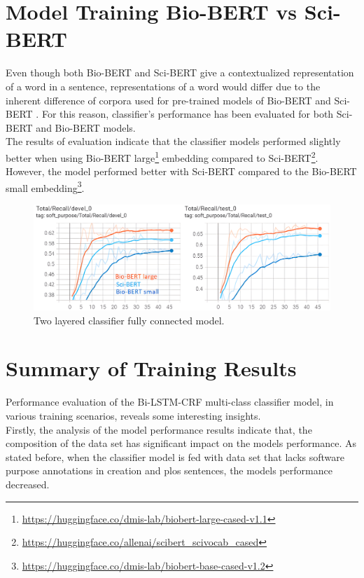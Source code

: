 \section{Model Training Bio-BERT vs Sci-BERT}
\label{sec:chapter06:biosci}

Even though both \ac{Bio-BERT} and \ac{Sci-BERT} give a contextualized representation of a word in a sentence, representations of a word would differ due to the inherent difference of corpora used for pre-trained models of Bio-BERT and Sci-BERT \citep{beltagy2019scibert,li2019fine}. For this reason, classifier’s performance has been evaluated for both Sci-BERT and Bio-BERT models. \\

The results of evaluation indicate that the classifier models performed slightly better when using Bio-BERT large\footnote{\url{https://huggingface.co/dmis-lab/biobert-large-cased-v1.1}} embedding compared to Sci-BERT\footnote{\url{https://huggingface.co/allenai/scibert_scivocab_cased}}. However, the model performed better with Sci-BERT compared to the Bio-BERT small embedding\footnote{\url{https://huggingface.co/dmis-lab/biobert-base-cased-v1.2}}. 

\begin{figure}[htbp]
	\centering
	\includegraphics[width=.90\textwidth]{4.graphics/figures/ch_6/6.BIoBERT_vs_SCIBERT_2LAYER_Classifier/HD/1}
	\caption{Two layered classifier fully connected model.}
	\label{fig:chapter06:with}
\end{figure}

\section{Summary of Training Results }
\label{sec:chapter06:summary}

Performance evaluation of the Bi-LSTM-CRF multi-class classifier model, in various training scenarios, reveals some interesting insights. \\

Firstly, the analysis of the model performance results indicate that, the composition of the data set has significant impact on the models performance. As stated before, when the classifier model is fed with data set that lacks software purpose annotations in creation and plos sentences, the models performance decreased. \\

